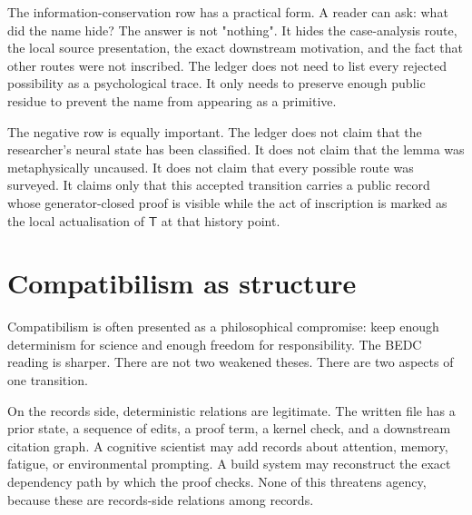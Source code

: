 The information-conservation row has a practical form.  A reader can ask:
what did the name hide?  The answer is not "nothing".  It hides the
case-analysis route, the local source presentation, the exact downstream
motivation, and the fact that other routes were not inscribed.  The ledger
does not need to list every rejected possibility as a psychological trace.
It only needs to preserve enough public residue to prevent the name from
appearing as a primitive.



The negative row is equally important.  The ledger does not claim that the
researcher's neural state has been classified.  It does not claim that the
lemma was metaphysically uncaused.  It does not claim that every possible
route was surveyed.  It claims only that this accepted transition carries a
public record whose generator-closed proof is visible while the act of
inscription is marked as the local actualisation of $\mathsf{T}$ at that
history point.

\section{Compatibilism as structure}
\label{sec:inscription-event-compatibilism}

Compatibilism is often presented as a philosophical compromise: keep enough
determinism for science and enough freedom for responsibility.  The BEDC
reading is sharper.  There are not two weakened theses.  There are two
aspects of one transition.

On the records side, deterministic relations are legitimate.  The written
file has a prior state, a sequence of edits, a proof term, a kernel check,
and a downstream citation graph.  A cognitive scientist may add records about
attention, memory, fatigue, or environmental prompting.  A build system may
reconstruct the exact dependency path by which the proof checks.  None of
this threatens agency, because these are records-side relations among
records.

